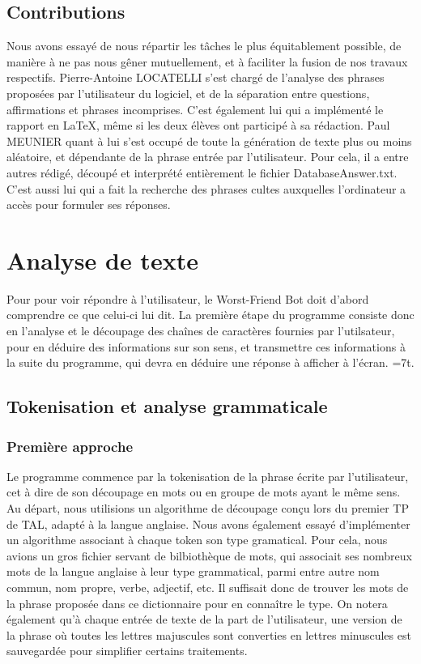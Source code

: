 \documentclass[paper=a4, fontsize=11pt]{article}
\begin{document}
\subsection{Contributions}
	Nous avons essayé de nous répartir les tâches le plus équitablement possible, de manière à ne pas nous gêner mutuellement, et à faciliter la fusion de nos travaux respectifs. Pierre-Antoine LOCATELLI s'est chargé de l'analyse des phrases proposées par l'utilisateur du logiciel, et de la séparation entre questions, affirmations et phrases incomprises. C'est également lui qui a implémenté le rapport en LaTeX, même si les deux élèves ont participé à sa rédaction. Paul MEUNIER quant à lui s'est occupé de toute la génération de texte plus ou moins aléatoire, et dépendante de la phrase entrée par l'utilisateur. Pour cela, il a entre autres rédigé, découpé et interprété entièrement le fichier DatabaseAnswer.txt. C'est aussi lui qui a fait la recherche des phrases cultes auxquelles l'ordinateur a accès pour formuler ses réponses.

\section{Analyse de texte}
	Pour pour voir répondre à l'utilisateur, le Worst-Friend Bot doit d'abord comprendre ce que celui-ci lui dit. La première étape du programme consiste donc en l'analyse et le découpage des chaînes de caractères fournies par l'utilsateur, pour en déduire des informations sur son sens, et transmettre ces informations à la suite du programme, qui devra en déduire une réponse à afficher à l'écran.
\parskip=7t. 

	
\subsection{Tokenisation et analyse grammaticale}
\subsubsection{Première approche}
	Le programme commence par la tokenisation de la phrase écrite par l'utilisateur, cet à dire de son découpage en mots ou en groupe de mots ayant le même sens. Au départ, nous utilisions un algorithme de découpage conçu lors du premier TP de TAL, adapté à la langue anglaise. Nous avons également essayé d'implémenter un algorithme associant à chaque token son type gramatical. Pour cela, nous avions un gros fichier servant de bilbiothèque de mots, qui associait ses nombreux mots de la langue anglaise à leur type grammatical, parmi entre autre \og nom commun\fg{}, \og nom propre\fg{}, \og verbe\fg{}, \og adjectif\fg{}, etc. Il suffisait donc de trouver les mots de la phrase proposée dans ce dictionnaire pour en connaître le type. On notera également qu'à chaque entrée de texte de la part de l'utilisateur, une version de la phrase où toutes les lettres majuscules sont converties en lettres minuscules est sauvegardée pour simplifier certains traitements.
\end{document}
